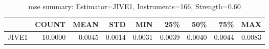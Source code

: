 \begin{table}[ht]
\centering
\caption{mse summary: Estimator=JIVE1, Instruments=166, Strength=0.60}
\begin{tabular}{lrrrrrrrr}
\toprule
 & COUNT & MEAN & STD & MIN & 25\% & 50\% & 75\% & MAX \\
\midrule
JIVE1 & 10.0000 & 0.0045 & 0.0014 & 0.0031 & 0.0039 & 0.0040 & 0.0044 & 0.0083 \\
\bottomrule
\end{tabular}
\end{table}

